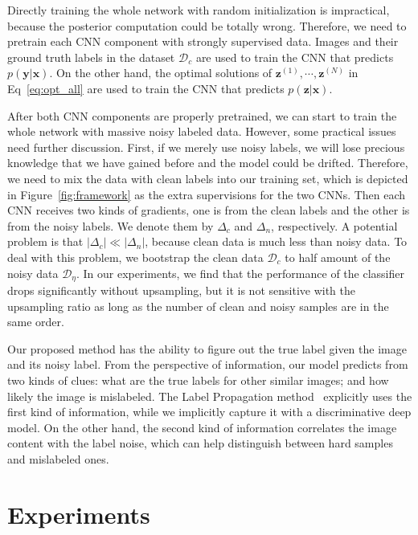 \documentclass[10pt,twocolumn,letterpaper]{article}
\def\vec{\mathbf}
\begin{document}
Directly training the whole network with random initialization is impractical, because the posterior computation could be totally wrong. Therefore, we need to pretrain each CNN component with strongly supervised data. Images and their ground truth labels in the dataset $\mathcal{D}_c$ are used to train the CNN that predicts $p(\vec{y}|\vec{x})$. On the other hand, the optimal solutions of $\vec{z}^{(1)},\cdots,\vec{z}^{(N)}$ in Eq~\eqref{eq:opt_all} are used to train the CNN that predicts $p(\vec{z}|\vec{x})$.

After both CNN components are properly pretrained, we can start to train the whole network with massive noisy labeled data. However, some practical issues need further discussion. First, if we merely use noisy labels, we will lose precious knowledge that we have gained before and the model could be drifted. Therefore, we need to mix the data with clean labels into our training set, which is depicted in Figure~\ref{fig:framework} as the extra supervisions for the two CNNs. Then each CNN receives two kinds of gradients, one is from the clean labels and the other is from the noisy labels. We denote them by $\Delta_c$ and $\Delta_n$, respectively. A potential problem is that $|\Delta_c| \ll |\Delta_n|$, because clean data is much less than noisy data. To deal with this problem, we bootstrap the clean data $\mathcal{D}_c$ to half amount of the noisy data $\mathcal{D}_{\eta}$. In our experiments, we find that the performance of the classifier drops significantly without upsampling, but it is not sensitive with the upsampling ratio as long as the number of clean and noisy samples are in the same order.

Our proposed method has the ability to figure out the true label given the image and its noisy label. From the perspective of information, our model predicts from two kinds of clues: what are the true labels for other similar images; and how likely the image is mislabeled. The Label Propagation method~\cite{zhu2002learning} explicitly uses the first kind of information, while we implicitly capture it with a discriminative deep model. On the other hand, the second kind of information correlates the image content with the label noise, which can help distinguish between hard samples and mislabeled ones.

\section{Experiments} %
\label{sec:experiments}
\end{document}
